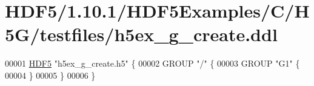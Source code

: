 \hypertarget{_h_d_f5_21_810_81_2_h_d_f5_examples_2_c_2_h5_g_2testfiles_2h5ex__g__create_8ddl_source}{}\section{H\+D\+F5/1.10.1/\+H\+D\+F5\+Examples/\+C/\+H5\+G/testfiles/h5ex\+\_\+g\+\_\+create.ddl}
\label{_h_d_f5_21_810_81_2_h_d_f5_examples_2_c_2_h5_g_2testfiles_2h5ex__g__create_8ddl_source}

\begin{DoxyCode}
00001 \hyperlink{namespace_h_d_f5}{HDF5} \textcolor{stringliteral}{"h5ex\_g\_create.h5"} \{
00002 GROUP \textcolor{stringliteral}{"/"} \{
00003    GROUP \textcolor{stringliteral}{"G1"} \{
00004    \}
00005 \}
00006 \}
\end{DoxyCode}
